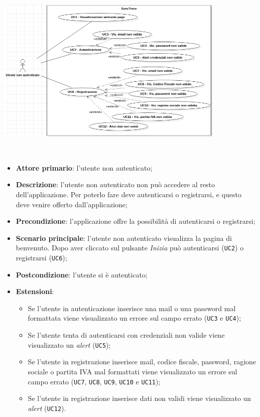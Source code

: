 \begin{minipage}{\linewidth}
  \label{img:nonautenticato}
  \centering
    \includegraphics[height=7cm]{immagini/uc/nonautenticato}
\end{minipage} \\

\begin{itemize}
  \item \textbf{Attore primario}: l'utente non autenticato;
  \item \textbf{Descrizione}: l'utente non autenticato non può accedere al resto dell'applicazione. Per poterlo fare deve autenticarsi o registrarsi, e questo deve venire offerto dall'applicazione;
  \item \textbf{Precondizione}: l'applicazione offre la possibilità di autenticarsi o registrarsi;
  \item \textbf{Scenario principale}: l'utente non autenticato visualizza la pagina di benvenuto. Dopo aver cliccato sul pulsante \textit{Inizia} può autenticarsi (\texttt{UC2}) o registrarsi (\texttt{UC6});
  \item \textbf{Postcondizione}: l'utente si è autenticato;
  \item \textbf{Estensioni}:
    \begin{itemize}
      \item Se l'utente in autenticazione inserisce una mail o una password mal formattata viene visualizzato un errore sul campo errato (\texttt{UC3} e \texttt{UC4});
      \item Se l'utente tenta di autenticarsi con credenziali non valide viene visualizzato un \textit{alert} (\texttt{UC5});
      \item Se l'utente in registrazione inserisce mail, codice fiscale, password, ragione sociale o partita IVA mal formattati viene visualizzato un errore sul campo errato (\texttt{UC7}, \texttt{UC8}, \texttt{UC9}, \texttt{UC10} e \texttt{UC11});
      \item Se l'utente in registrazione inserisce dati non validi viene visualizzato un \textit{alert} (\texttt{UC12}).
    \end{itemize}
\end{itemize}

